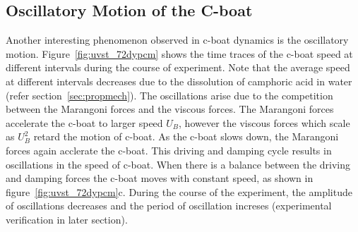 \documentclass[aps, twocolumn, floatfix, superscriptaddress]{revtex4}
\begin{document}
\subsection{Oscillatory Motion of the C-boat}
\label{sec:oscboat}
Another interesting phenomenon observed in c-boat dynamics is the oscillatory motion. Figure~\ref{fig:uvst_72dypcm} shows the time traces of the c-boat speed at different intervals during the course of experiment. Note that the average speed at different intervals decreases due to the dissolution of camphoric acid in water (refer section~\ref{sec:propmech}). The oscillations arise due to the competition between the Marangoni forces and the viscous forces. The Marangoni forces accelerate the c-boat to larger speed $U_{B}$, however the viscous forces which scale as $U_{B}^{2}$ retard the motion of c-boat. As the c-boat slows down, the Marangoni forces again acclerate the c-boat. This driving and damping cycle results in oscillations in the speed of c-boat. When there is a balance between the driving and damping forces the c-boat moves with constant speed, as shown in figure~\ref{fig:uvst_72dypcm}c. During the course of the experiment, the amplitude of oscillations decreases and the period of oscillation increses (experimental verification in later section). \par
\end{document}
